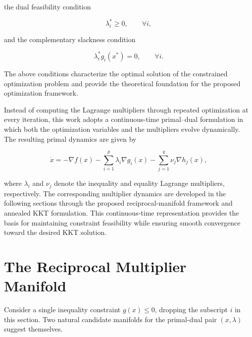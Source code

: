 \documentclass[11pt,onecolumn]{article}
\theoremstyle{definition}
\theoremstyle{remark}
\begin{document}
the dual feasibility condition

\begin{equation}
\lambda_i^{*}\ge0,
\qquad \forall i,
\label{eq:dual_feasibility}
\end{equation}

and the complementary slackness condition

\begin{equation}
\lambda_i^{*}g_i(x^{*})=0,
\qquad \forall i.
\label{eq:complementary_slackness}
\end{equation}

The above conditions characterize the optimal solution of the constrained optimization problem and provide the theoretical foundation for the proposed optimization framework.

Instead of computing the Lagrange multipliers through repeated optimization at every iteration, this work adopts a continuous-time primal--dual formulation in which both the optimization variables and the multipliers evolve dynamically. The resulting primal dynamics are given by

\begin{equation}
\dot{x}
=
-\nabla f(x)
-\sum_{i=1}^{p}\lambda_i\nabla g_i(x)
-\sum_{j=1}^{q}\nu_j\nabla h_j(x),
\label{eq:primal_flow}
\end{equation}

where $\lambda_i$ and $\nu_j$ denote the inequality and equality Lagrange multipliers, respectively. The corresponding multiplier dynamics are developed in the following sections through the proposed reciprocal-manifold framework and annealed KKT formulation. This continuous-time representation provides the basis for maintaining constraint feasibility while ensuring smooth convergence toward the desired KKT solution.








\section{The Reciprocal Multiplier Manifold} \label{sec:manifold}

Consider a single inequality constraint $g(x) \le 0$, dropping the subscript $i$ in this
section. Two natural candidate manifolds for the primal-dual pair $(x, \lambda)$ suggest
themselves.
\end{document}
